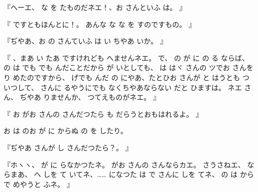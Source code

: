 『へーエ、
な
を
たものだネエ！、お
さんといふ
は。
』

『
ですともほんとに！。
あんな
な
な
を
すのですもの。
』

『ぢやあ、お
の
さんていふ
は
い
ちやあ
いか。
』

『
、まあ
い
たあ
ですけれども
へませんネエ。
で、
の
が
に
の
る
ならば、
の
は
でも
でも
んだことだから
が
いとしても、
は
はヾ
さんの
ツでお
さんを
り
めたのですから、
げでも
んだ
の
にやあ、たとひお
さんが
と
はうとも
つ
いつして、
さんに
るやうにでも
なくちやあならない
だと
ひますは。
ネエ
さん、
ぢやあ
りませんか、
つてえものがネエ。
』

『
お
がお
さんの
さんだつたら
も
だらうとおもはれるよ。
』

お
は
のお
が
に
からぬ
の
を
したり。

『ぢやあ
さんが
し
さんだつたら？。
』

『ホヽヽ、
が
に
らなかつたネ。
がお
さんの
さんならカエ。
さうさねエ、
ならまあ、
へ
しを
て
いてネ、……
になつた
は
で
さんに
しを
てネ、
の
は
から
で
めやうと
ふネ。
』

